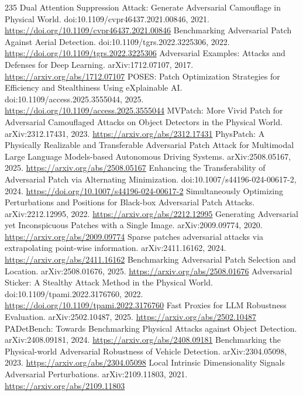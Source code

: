 \documentclass[11pt]{article}
\begin{document}
\begin{thebibliography}{235}
 Dual Attention Suppression Attack: Generate Adversarial Camouflage in Physical World. doi:10.1109/cvpr46437.2021.00846, 2021. \url{https://doi.org/10.1109/cvpr46437.2021.00846}
 Benchmarking Adversarial Patch Against Aerial Detection. doi:10.1109/tgrs.2022.3225306, 2022. \url{https://doi.org/10.1109/tgrs.2022.3225306}
 Adversarial Examples: Attacks and Defenses for Deep Learning. arXiv:1712.07107, 2017. \url{https://arxiv.org/abs/1712.07107}
 POSES: Patch Optimization Strategies for Efficiency and Stealthiness Using eXplainable AI. doi:10.1109/access.2025.3555044, 2025. \url{https://doi.org/10.1109/access.2025.3555044}
 MVPatch: More Vivid Patch for Adversarial Camouflaged Attacks on Object Detectors in the Physical World. arXiv:2312.17431, 2023. \url{https://arxiv.org/abs/2312.17431}
 PhysPatch: A Physically Realizable and Transferable Adversarial Patch Attack for Multimodal Large Language Models-based Autonomous Driving Systems. arXiv:2508.05167, 2025. \url{https://arxiv.org/abs/2508.05167}
 Enhancing the Transferability of Adversarial Patch via Alternating Minimization. doi:10.1007/s44196-024-00617-2, 2024. \url{https://doi.org/10.1007/s44196-024-00617-2}
 Simultaneously Optimizing Perturbations and Positions for Black-box Adversarial Patch Attacks. arXiv:2212.12995, 2022. \url{https://arxiv.org/abs/2212.12995}
 Generating Adversarial yet Inconspicuous Patches with a Single Image. arXiv:2009.09774, 2020. \url{https://arxiv.org/abs/2009.09774}
 Sparse patches adversarial attacks via extrapolating point-wise information. arXiv:2411.16162, 2024. \url{https://arxiv.org/abs/2411.16162}
 Benchmarking Adversarial Patch Selection and Location. arXiv:2508.01676, 2025. \url{https://arxiv.org/abs/2508.01676}
 Adversarial Sticker: A Stealthy Attack Method in the Physical World. doi:10.1109/tpami.2022.3176760, 2022. \url{https://doi.org/10.1109/tpami.2022.3176760}
 Fast Proxies for LLM Robustness Evaluation. arXiv:2502.10487, 2025. \url{https://arxiv.org/abs/2502.10487}
 PADetBench: Towards Benchmarking Physical Attacks against Object Detection. arXiv:2408.09181, 2024. \url{https://arxiv.org/abs/2408.09181}
 Benchmarking the Physical-world Adversarial Robustness of Vehicle Detection. arXiv:2304.05098, 2023. \url{https://arxiv.org/abs/2304.05098}
 Local Intrinsic Dimensionality Signals Adversarial Perturbations. arXiv:2109.11803, 2021. \url{https://arxiv.org/abs/2109.11803}

\end{thebibliography}
\end{document}
